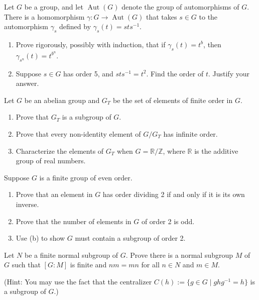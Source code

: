 \documentclass[11pt,twoside,openany]{memoir}
\begin{document}
        \begin{exercise}
        Let $G$ be a group, and let $\operatorname{Aut}(G)$ denote the group of automorphisms of $G$. There is a homomorphism $\gamma:G\to \operatorname{Aut}(G)$ that takes $s\in G$ to the automorphism $\gamma_s$ defined by $\gamma_s(t)=sts^{-1}$.
        \begin{enumerate}[label=(\alph*)]
            \item Prove rigorously, possibly with induction, that if $\gamma_s(t)=t^b$, then $\gamma_{s^n}(t)=t^{b^n}$.
            \item Suppose $s\in G$ has order 5, and $sts^{-1}=t^2$. Find the order of $t$. Justify your answer.
        \end{enumerate}
        \end{exercise}
        
        \begin{exercise}
        Let $G$ be an abelian group and $G_T$ be the set of elements of finite order in $G$.
        \begin{enumerate}[label=(\alph*)]
            \item Prove that $G_T$ is a subgroup of $G$.
            \item Prove that every non-identity element of $G/G_T$ has infinite order.
            \item Characterize the elements of $G_T$ when $G=\mathbb{R}/\mathbb{Z}$, where $\mathbb{R}$ is the additive group of real numbers.
        \end{enumerate}
        \end{exercise}
        
        \begin{exercise}
        Suppose $G$ is a finite group of even order.
        \begin{enumerate}[label=(\alph*)]
            \item Prove that an element in $G$ has order dividing 2 if and only if it is its own inverse.
            \item Prove that the number of elements in $G$ of order 2 is odd.
            \item Use (b) to show $G$ must contain a subgroup of order 2.
        \end{enumerate}
        \end{exercise}
        
        \begin{exercise}
        Let $N$ be a finite normal subgroup of $G$. Prove there is a normal subgroup $M$ of $G$ such that $[G:M]$ is finite and $nm=mn$ for all $n\in N$ and $m\in M$.
        
        \medskip
        \noindent ({Hint:} You may use the fact that the centralizer $C(h):=\{g\in G\mid ghg^{-1}=h\}$ is a subgroup of $G$.)
        \end{exercise}
        
\end{document}

